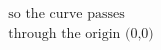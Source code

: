 \documentclass[preview]{standalone}
\begin{document}
\begin{align*}
\text{so the curve passes} \\ \text{through the origin (0,0)}
\end{align*}
\end{document}
